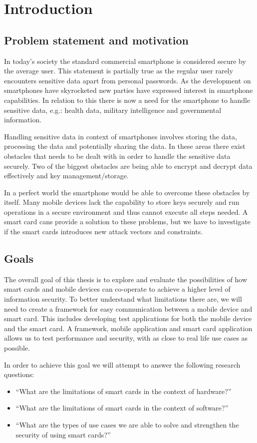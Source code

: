 \chapter{Introduction}
\section{Problem statement and motivation}
In today's society the standard commercial smartphone is considered secure by the average user. This statement is partially true as the regular user rarely encounters sensitive data apart from personal passwords. As the development on smartphones have skyrocketed new parties have expressed interest in smartphone capabilities. In relation to this there is now a need for the smartphone to handle sensitive data, e.g.: health data, military intelligence and governmental information.

Handling sensitive data in context of smartphones involves storing the data, processing the data and potentially sharing the data. In these areas there exist obstacles that needs to be dealt with in order to handle the sensitive data securely. Two of the biggest obstacles are being able to encrypt and decrypt data effectively and key management/storage.

 In a perfect world the smartphone would be able to overcome these obstacles by itself. Many mobile devices lack the capability to store keys securely and run operations in a secure environment and thus cannot execute all steps needed. A smart card cans provide a solution to these problems, but we have to investigate if the smart cards introduces new attack vectors and constraints.

\section{Goals}
\label{sec:goals}
The overall goal of this thesis is to explore and evaluate the possibilities of how smart cards and mobile devices can co-operate to achieve a higher level of information security. To better understand what limitations there are, we will need to create a framework for easy communication between a mobile device and smart card. This includes developing test applications for both the mobile device and the smart card. A framework, mobile application and smart card application allows us to test performance and security, with as close to real life use cases as possible.

In order to achieve this goal we will attempt to answer the following research questions:
\begin{itemize}
  \item ``What are the limitations of smart cards in the context of hardware?''
  \item ``What are the limitations of smart cards in the context of software?''
  \item ``What are the types of use cases we are able to solve and strengthen the security of using smart cards?''
\end{itemize}

